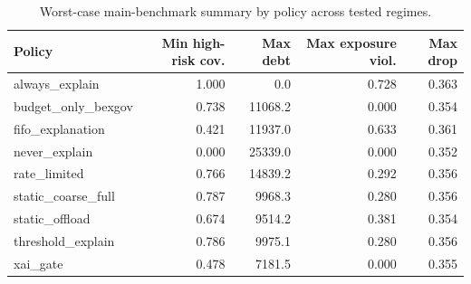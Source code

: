 \begin{table}[t]
\caption{Worst-case main-benchmark summary by policy across tested regimes.}
\label{tab:main_worst_case_by_policy}
\centering
\scriptsize
\begin{tabular}{@{}lrrrr@{}}
\toprule
Policy & Min high-risk cov. & Max debt & Max exposure viol. & Max drop \\
\midrule
always\_explain & 1.000 & 0.0 & 0.728 & 0.363 \\
budget\_only\_bexgov & 0.738 & 11068.2 & 0.000 & 0.354 \\
fifo\_explanation & 0.421 & 11937.0 & 0.633 & 0.361 \\
never\_explain & 0.000 & 25339.0 & 0.000 & 0.352 \\
rate\_limited & 0.766 & 14839.2 & 0.292 & 0.356 \\
static\_coarse\_full & 0.787 & 9968.3 & 0.280 & 0.356 \\
static\_offload & 0.674 & 9514.2 & 0.381 & 0.354 \\
threshold\_explain & 0.786 & 9975.1 & 0.280 & 0.356 \\
xai\_gate & 0.478 & 7181.5 & 0.000 & 0.355 \\
\bottomrule
\end{tabular}
\end{table}
